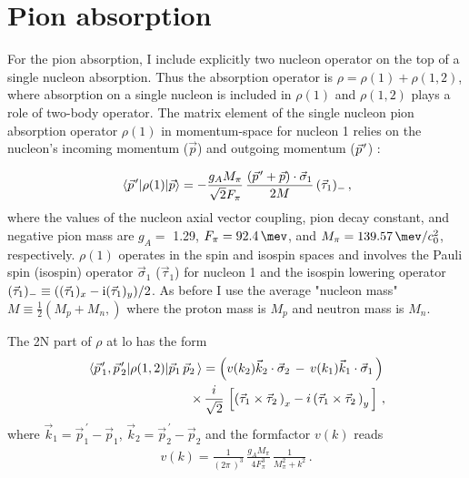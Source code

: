     \section{Pion absorption}
    \label{sec:pion_formalism}

    For the pion absorption, I include explicitly
    two nucleon operator on the top of a single nucleon absorption.
    Thus the absorption operator is $\rho = \rho(1) + \rho(1, 2)$,
    where absorption on  a single nucleon is included in $\rho(1)$ and
    $\rho(1, 2)$ plays a role of two-body operator.
    The matrix element of the single nucleon pion absorption operator $\rho(1)$ in momentum-space for nucleon 1 relies on the
    nucleon's incoming momentum ($\vec{p}$) and outgoing momentum ($\pvec{p}$) \cite{BERNARD_1995}:

    \begin{eqnarray}
        \matrixel{\pvec{p}} 
        {\rho(1)} {\vec{p}} = 
        - \frac{g_A M_\pi}{\sqrt{2} F_\pi } \,
            \frac{ \left( \pvec{p} +  \vec{p} \right) \cdot  \vec{\sigma}_1 } { 2 M } \, 
            (\vec{\tau}_1)_- \, ,
    \label{rho1}
    \end{eqnarray}
    where the values of the nucleon axial vector coupling, pion decay constant, and negative pion mass are $g_A =$ 1.29, 
    $F_\pi = \SI{92.4}{\mev}$, and $M_\pi = \SI{139.57}{\mev \per \clight\squared}$, respectively. $\rho (1)$ operates in the spin
    and isospin spaces and involves the Pauli spin (isospin) operator $\vec{\sigma}_1$ ($\vec{\tau}_1$) for nucleon 1 and the isospin lowering operator
    $(\vec{\tau}_1)_- \equiv((\vec{\tau}_1)_x -{\rm i} (\vec{\tau}_1)_y)/2$.
    As before I use the average 
    "nucleon mass" $M \equiv \frac{1}{2} \left( M_p + M_n , \right)$ where the proton mass is $M_p$ and neutron mass is $M_n$.



    The 2N part of $\rho$ at \gls{lo} has the form \cite{Lensky2006}
    \begin{eqnarray}
    \matrixel{
        \pvec{p}_1, \pvec{p}_2
        } 
    {\rho(1,2)}
    {
        \vec{p}_1 \, 
        \vec{p}_2 \, 
        } = 
        \left(
        v( k_2 )  \vec{k}_2 \cdot \vec{\sigma}_2 \, - \, 
        v( k_1 )  \vec{k}_1 \cdot \vec{\sigma}_1 \,
        \right) \, \nonumber \\ \times \,
        \frac{i}{\sqrt{2}} \, 
        \left[ 
            \left( \vec{\tau}_1 \times \vec{\tau}_2 \, \right)_x 
            - i \left( \vec{\tau}_1 \times \vec{\tau}_2 \, \right)_y \,
        \right] \,,
    \label{rho12}
    \end{eqnarray}
    where 
    $ \vec{k}_1 = \vec{p}_1^{\, \prime} - \vec{p}_1 $,
    $ \vec{k}_2 = \vec{p}_2^{\, \prime} - \vec{p}_2 $
    and the formfactor $v(k)$ reads 
    \begin{eqnarray}
    v (k) = \frac 1{ \left( 2 \pi \, \right)^3 } \,
            \frac{g_A M_\pi}{4 F_\pi^3 } \,
        \frac1{M_\pi^2 + k^2 } \, .
    \label{vk}
    \end{eqnarray}

